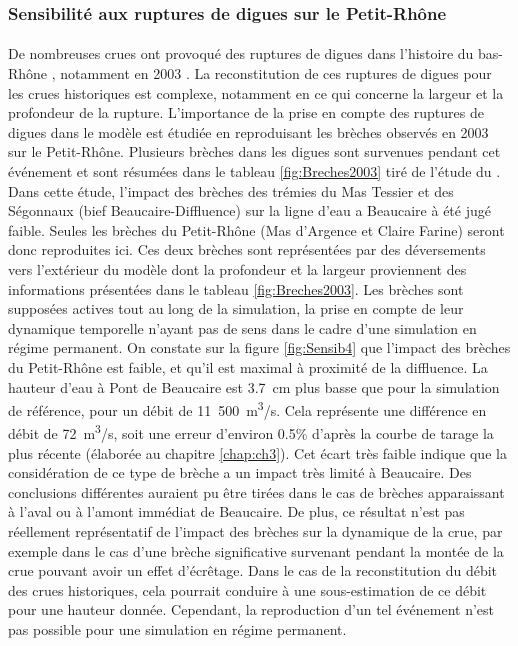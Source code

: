 	\subsubsection{Sensibilité aux ruptures de digues sur le Petit-Rhône}
	
	\paragraph{} De nombreuses crues ont provoqué des ruptures de digues dans l'histoire du bas-Rhône \citep{pichard_sept_2014}, notamment en 2003 \citep{medd_debit_2005}. La reconstitution de ces ruptures de digues pour les crues historiques est complexe, notamment en ce qui concerne la largeur et la profondeur de la rupture. L'importance de la prise en compte des ruptures de digues dans le modèle est étudiée en reproduisant les brèches observés en 2003 sur le Petit-Rhône. Plusieurs brèches dans les digues sont survenues pendant cet événement et sont résumées dans le tableau \ref{fig:Breches2003} tiré de l'étude du \citet{symadrem_programme_2012}. Dans cette étude, l'impact des brèches des trémies du Mas Tessier et des Ségonnaux (bief Beaucaire-Diffluence) sur la ligne d'eau a Beaucaire à été jugé faible. Seules les brèches du Petit-Rhône (Mas d'Argence et Claire Farine) seront donc reproduites ici. Ces deux brèches sont représentées par des déversements vers l'extérieur du modèle dont la profondeur et la largeur proviennent des informations présentées dans le tableau \ref{fig:Breches2003}. Les brèches sont supposées actives tout au long de la simulation, la prise en compte de leur dynamique temporelle n'ayant pas de sens dans le cadre d'une simulation en régime permanent. On constate sur la figure \ref{fig:Sensib4} que l'impact des brèches du Petit-Rhône est faible, et qu'il est maximal à proximité de la diffluence. La hauteur d'eau à Pont de Beaucaire est 3.7~cm plus basse que pour la simulation de référence, pour un débit de 11~500~m\textsuperscript{3}/s. Cela représente une différence en débit de 72~m\textsuperscript{3}/s, soit une erreur d'environ 0.5\% d'après la courbe de tarage la plus récente (élaborée au chapitre \ref{chap:ch3}). Cet écart très faible indique que la considération de ce type de brèche a un impact très limité à Beaucaire. Des conclusions différentes auraient pu être tirées dans le cas de brèches apparaissant à l'aval ou à l'amont immédiat de Beaucaire. De plus, ce résultat n'est pas réellement représentatif de l'impact des brèches sur la dynamique de la crue, par exemple dans le cas d'une brèche significative survenant pendant la montée de la crue pouvant avoir un effet d'écrêtage. Dans le cas de la reconstitution du débit des crues historiques, cela pourrait conduire à une sous-estimation de ce débit pour une hauteur donnée. Cependant, la reproduction d'un tel événement n'est pas possible pour une simulation en régime permanent.
	
